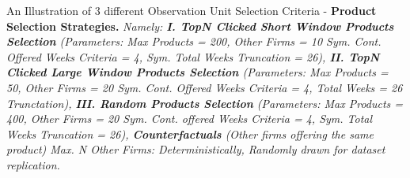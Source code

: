 \documentclass{article}
\begin{document}
\begin{center}


\end{center}
An Illustration of 3 different Observation Unit Selection Criteria - \textbf{Product Selection Strategies.}
\textit{
Namely: 
\textbf{I. TopN Clicked Short Window Products Selection}
(Parameters: Max Products = 200, Other Firms = 10
Sym. Cont. Offered Weeks Criteria = 4, Sym. Total Weeks Truncation = 26),
\textbf{II. TopN Clicked Large Window Products Selection}
(Parameters: Max Products = 50, Other Firms = 20
Sym. Cont. Offered Weeks Criteria = 4, Total Weeks = 26 Trunctation),
\textbf{III. Random Products Selection}
(Parameters: Max Products = 400, Other Firms = 20
Sym. Cont. offered Weeks Criteria = 4, Sym. Total Weeks Truncation = 26),
\textbf{Counterfactuals} (Other firms offering the same product)
Max. N Other Firms: Deterministically, Randomly drawn for dataset replication.
}
\end{document}
